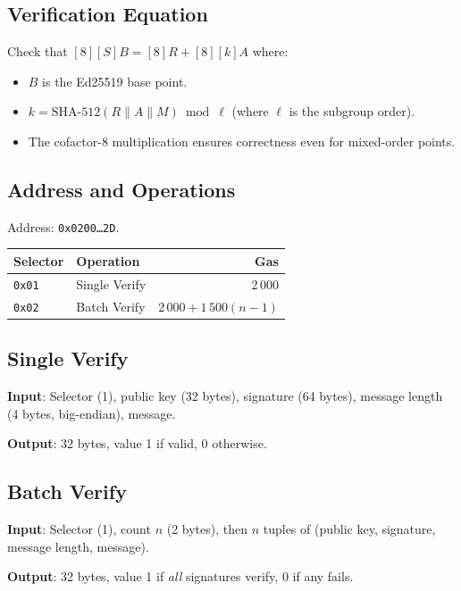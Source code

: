 \documentclass[11pt,a4paper]{article}
\begin{document}
\subsection{Verification Equation}

Check that $[8][S]B = [8]R + [8][k]A$ where:
\begin{itemize}
  \item $B$ is the Ed25519 base point.
  \item $k = \text{SHA-512}(R \| A \| M) \bmod \ell$ (where $\ell$ is the subgroup order).
  \item The cofactor-8 multiplication ensures correctness even for
    mixed-order points.
\end{itemize}

\subsection{Address and Operations}

Address: \texttt{0x0200\ldots2D}.

\begin{table}[H]
\centering
\begin{tabular}{llr}
\toprule
\textbf{Selector} & \textbf{Operation} & \textbf{Gas} \\
\midrule
\texttt{0x01} & Single Verify & 2\,000 \\
\texttt{0x02} & Batch Verify & $2\,000 + 1\,500(n-1)$ \\
\bottomrule
\end{tabular}
\end{table}

\subsection{Single Verify}

\textbf{Input}: Selector (1), public key (32 bytes), signature (64 bytes),
message length (4 bytes, big-endian), message.

\textbf{Output}: 32 bytes, value 1 if valid, 0 otherwise.

\subsection{Batch Verify}

\textbf{Input}: Selector (1), count $n$ (2 bytes), then $n$ tuples of
(public key, signature, message length, message).

\textbf{Output}: 32 bytes, value 1 if \emph{all} signatures verify, 0 if any fails.
\end{document}
